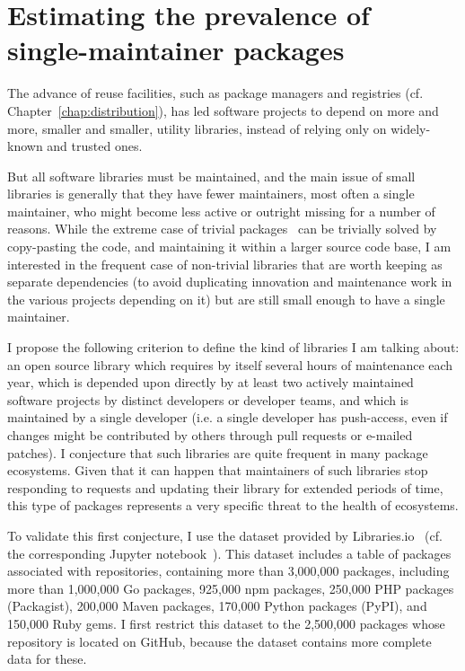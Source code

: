 \section{Estimating the prevalence of single-maintainer packages}

\label{sec:single-maintainer-libraries}

The advance of reuse facilities, such as package managers and registries (cf. Chapter~\ref{chap:distribution}), has led software projects to depend on more and more, smaller and smaller, utility libraries, instead of relying only on widely-known and trusted ones.

But all software libraries must be maintained, and the main issue of small libraries is generally that they have fewer maintainers, most often a single maintainer, who might become less active or outright missing for a number of reasons.
While the extreme case of trivial packages~\cite{abdalkareem2017developers} can be trivially solved by copy-pasting the code, and maintaining it within a larger source code base, I am interested in the frequent case of non-trivial libraries that are worth keeping as separate dependencies (to avoid duplicating innovation and maintenance work in the various projects depending on it) but are still small enough to have a single maintainer.

I propose the following criterion to define the kind of libraries I am talking about: an open source library which requires by itself several hours of maintenance each year, which is depended upon directly by at least two actively maintained software projects by distinct developers or developer teams, and which is maintained by a single developer (i.e. a single developer has push-access, even if changes might be contributed by others through pull requests or e-mailed patches).
I conjecture that such libraries are quite frequent in many package ecosystems.
Given that it can happen that maintainers of such libraries stop responding to requests and updating their library for extended periods of time, this type of packages represents a very specific threat to the health of ecosystems.

To validate this first conjecture, I use the dataset provided by Libraries.io~\cite{andrew_nesbitt_2017_808273} (cf. the corresponding Jupyter notebook~\cite{zimmermann2019librariesio}).
This dataset includes a table of packages associated with repositories, containing more than 3,000,000 packages, including more than 1,000,000 Go packages, 925,000 npm packages, 250,000 PHP packages (Packagist), 200,000 Maven packages, 170,000 Python packages (PyPI), and 150,000 Ruby gems.
I first restrict this dataset to the 2,500,000 packages whose repository is located on GitHub, because the dataset contains more complete data for these.

